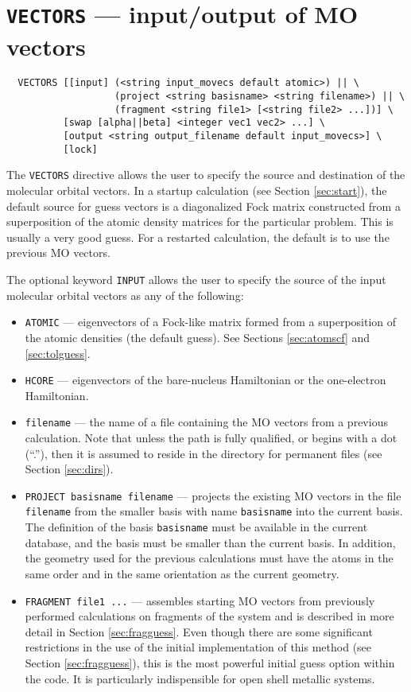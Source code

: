 \section{{\tt VECTORS} --- input/output of MO vectors}
\label{sec:vectors}


\begin{verbatim}
  VECTORS [[input] (<string input_movecs default atomic>) || \
                   (project <string basisname> <string filename>) || \
                   (fragment <string file1> [<string file2> ...])] \
          [swap [alpha||beta] <integer vec1 vec2> ...] \
          [output <string output_filename default input_movecs>] \
          [lock]
\end{verbatim}

The \verb+VECTORS+ directive allows the user to specify the source and
destination of the molecular orbital vectors.  In a startup
calculation (see Section \ref{sec:start}), the default source for
guess vectors is a diagonalized Fock matrix constructed from a
superposition of the atomic density matrices for the particular
problem.  This is usually a very good guess.  For a restarted 
calculation, the default is to use the previous MO vectors.

The optional keyword \verb+INPUT+ allows the user to specify the
source of the input molecular orbital vectors as any of the following:
\begin{itemize}
\item \verb+ATOMIC+ --- eigenvectors of a Fock-like matrix formed from
  a superposition of the atomic densities (the default guess).  See
  Sections \ref{sec:atomscf} and \ref{sec:tolguess}.  
\item \verb+HCORE+ --- eigenvectors of the bare-nucleus Hamiltonian or
  the one-electron Hamiltonian.
\item \verb+filename+ --- the name of a file containing the MO vectors
  from a previous calculation.  Note that unless the path is fully
  qualified, or begins with a dot (``.''), then it is assumed to
  reside in the directory for permanent files (see Section
  \ref{sec:dirs}).
\item \verb+PROJECT basisname filename+ --- projects the existing MO
  vectors in the file \verb+filename+ from the smaller basis with name
  \verb+basisname+ into the current basis.  The definition of the
  basis \verb+basisname+ must be available in the current database,
  and the basis must be smaller than the current basis.  In addition,
  the geometry used for the previous calculations must have the atoms
  in the same order and in the same orientation as the current
  geometry.
\item \verb+FRAGMENT file1 ...+ --- assembles starting MO vectors from
  previously performed calculations on fragments of the system and is
  described in more detail in Section \ref{sec:fragguess}.  Even
  though there are some significant restrictions in the use of the
  initial implementation of this method (see Section
  \ref{sec:fragguess}), this is the most powerful initial guess option
  within the code.  It is particularly indispensible for open shell
  metallic systems.
\end{itemize}
 
